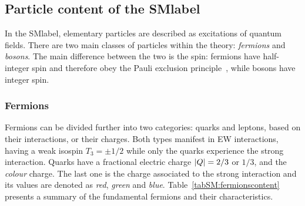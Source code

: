 \subsection{Particle content of the \acrlong{SMlabel}}

In the \acrshort{SMlabel}, elementary particles are described as excitations of quantum fields.
There are two main classes of particles within the theory: \textit{fermions} and \textit{bosons}.
The main difference between the two is the spin: fermions have half-integer spin and therefore obey the Pauli exclusion
principle~\cite{Pauli1925}, while bosons have integer spin.

\subsubsection{Fermions}

Fermions can be divided further into two categories: quarks and leptons, based on their interactions, or their charges.
Both types manifest in \acrshort{EW} interactions, having a weak isospin $T_3=\pm1/2$ while only the quarks experience the strong interaction. Quarks have a fractional electric charge $\abs{Q}=2/3$ or $1/3$, and the \textit{colour} charge. The last one is the charge associated to the strong interaction and its values are denoted as \textit{red}, \textit{green} and \textit{blue}. Table~\ref{tabSM:fermionscontent} presents a summary of the fundamental fermions and their characteristics.\\

